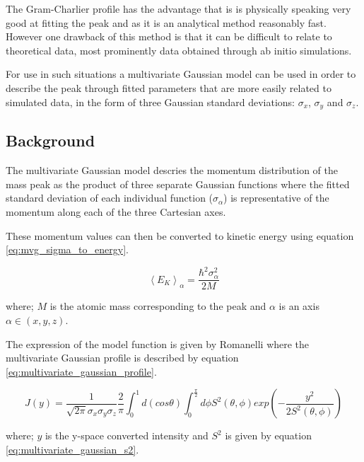 \documentclass[a4paper]{article}
\begin{document}
The Gram-Charlier profile has the advantage that is is physically speaking very
good at fitting the peak and as it is an analytical method reasonably fast.
However one drawback of this method is that it can be difficult to relate to
theoretical data, most prominently data obtained through ab initio simulations.

For use in such situations a multivariate Gaussian model can be used in order to
describe the peak through fitted parameters that are more easily related to
simulated data, in the form of three Gaussian standard deviations: $\sigma_{x}$,
$\sigma_{y}$ and $\sigma_{z}$.

\subsection{Background}
\label{sec:mvg_background}

The multivariate Gaussian model descries the momentum distribution of the mass
peak as the product of three separate Gaussian functions where the fitted
standard deviation of each individual function ($\sigma_{\alpha}$) is
representative of the momentum along each of the three Cartesian axes.

These momentum values can then be converted to kinetic energy using equation
\ref{eq:mvg_sigma_to_energy}.

\begin{equation}
  \label{eq:mvg_sigma_to_energy}
  \left<E_{K}\right>_{\alpha} = \frac{\hbar^{2} \sigma_{\alpha}^{2}}{2 M}
\end{equation}

where; $M$ is the atomic mass corresponding to the peak and $\alpha$ is an axis
$\alpha \in (x, y, z)$.

The expression of the model function is given by Romanelli \cite{Romanelli2015}
where the multivariate Gaussian profile is described by equation
\ref{eq:multivariate_gaussian_profile}.

\begin{equation}
  \label{eq:multivariate_gaussian_profile}
  J(y) =
    \frac{1}{\sqrt{2 \pi} \sigma_{x} \sigma_{y} \sigma_{z}}
    \frac{2}{\pi}
    \int_{0}^{1} d(cos \theta)
    \int_{0}^{\frac{\pi}{2}} d \phi
    S^{2}(\theta, \phi)
    exp\left(-\frac{y^{2}}{2 S^{2}(\theta, \phi)}\right)
\end{equation}

where; $y$ is the y-space converted intensity and $S^{2}$ is given by equation
\ref{eq:multivariate_gaussian_s2}.
\end{document}
